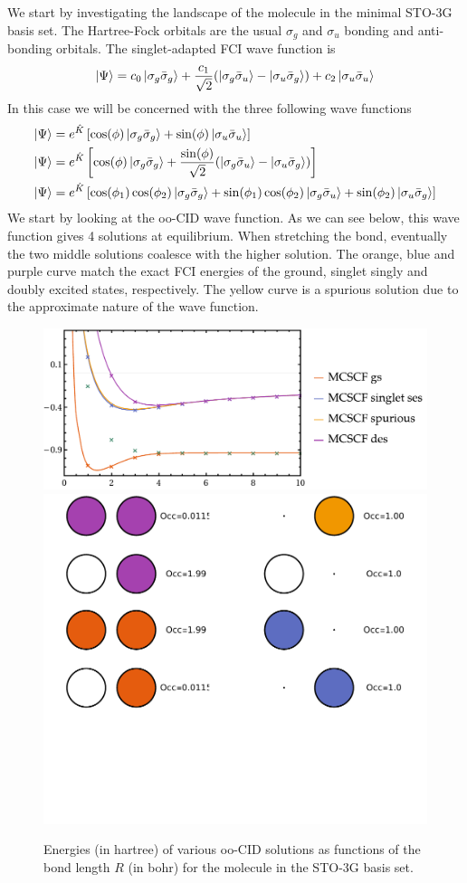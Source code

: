 \documentclass[11pt,a4paper]{article}
\newcommand{\hK}{\Hat{K}} %
\begin{document}
We start by investigating the landscape of the  molecule in the minimal STO-3G basis set.
The Hartree-Fock orbitals are the usual $\sigma_g$ and $\sigma_u$ bonding and anti-bonding orbitals.
The singlet-adapted FCI wave function is
\begin{equation}
  \label{eq:H2_FCI_WF}
  \ket{\Psi} = c_0\ket{\sigma_g\bar{\sigma}_g} + \frac{c_1}{\sqrt{2}}(\ket{\sigma_g\bar{\sigma}_u} - \ket{\sigma_u\bar{\sigma}_g}) + c_2\ket{\sigma_u\bar{\sigma}_u}
\end{equation}
In this case we will be concerned with the three following wave functions
\begin{subequations}
  \begin{align}
    \ket{\Psi} &= e^{\hK}\left[\cos(\phi)\ket{\sigma_g\bar{\sigma}_g} + \sin(\phi)\ket{\sigma_u\bar{\sigma}_u}\right] \\
    \ket{\Psi} &= e^{\hK}\left[\cos(\phi)\ket{\sigma_g\bar{\sigma}_g} + \frac{\sin(\phi)}{\sqrt{2}}(\ket{\sigma_g\bar{\sigma}_u} - \ket{\sigma_u\bar{\sigma}_g})\right]  \\
    \ket{\Psi} &= e^{\hK}\left[\cos(\phi_1)\cos(\phi_2)\ket{\sigma_g\bar{\sigma}_g} + \sin(\phi_1)\cos(\phi_2)\ket{\sigma_g\bar{\sigma}_u} + \sin(\phi_2) \ket{\sigma_u\bar{\sigma}_g}\right]
  \end{align}
\end{subequations}
We start by looking at the oo-CID wave function. As we can see below, this wave function gives 4 solutions at equilibrium. When stretching the bond, eventually the two middle solutions coalesce with the higher solution.
The orange, blue and purple curve match the exact FCI energies of the ground, singlet singly and doubly excited states, respectively.
The yellow curve is a spurious solution due to the approximate nature of the wave function.
\begin{figure}
  \centering
  \includegraphics[width=0.67\linewidth]{Figures/H2_ooCID_PES}
  \includegraphics[width=0.32\linewidth]{Figures/H2_ooCID_MO}
  \caption{
    Energies (in hartree) of various oo-CID solutions as functions of the bond length $R$ (in bohr) for the  molecule in the STO-3G basis set.
    \label{fig:H2ooCID}}
\end{figure}
\end{document}
